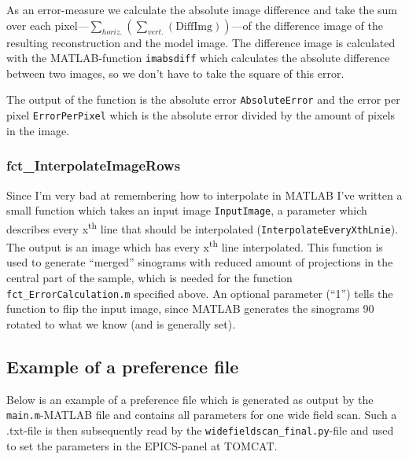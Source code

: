 \documentclass[a4paper]{scrartcl}
\begin{document}
As an error-measure we calculate the absolute image difference and take the sum over each pixel---$\sum_{horiz.}(\sum_{vert.}(\textrm{DiffImg}))$---of the difference image of the resulting reconstruction and the model image. The difference image is calculated with the MATLAB-function \verb+imabsdiff+ which calculates the absolute difference between two images, so we don't have to take the square of this error.

The output of the function is the absolute error \verb+AbsoluteError+ and the error per pixel \verb+ErrorPerPixel+ which is the absolute error divided by the amount of pixels in the image.

\subsubsection{fct_InterpolateImageRows}
Since I'm very bad at remembering how to interpolate in MATLAB I've written a small function which takes an input image \verb+InputImage+, a parameter which describes every x\textsuperscript{th} line that should be interpolated (\verb+InterpolateEveryXthLnie+). The output is an image which has every x\textsuperscript{th} line interpolated. This function is used to generate ``merged'' sinograms with reduced amount of projections in the central part of the sample, which is needed for the function \verb+fct_ErrorCalculation.m+ specified above. An optional parameter (``1'') tells the function to flip the input image, since MATLAB generates the sinograms \si{90}{\degree} rotated to what we know (and is generally set).

\subsection{Example of a preference file}%
\label{sec:preference file}
Below is an example of a preference file which is generated as output by the \verb+main.m+-MATLAB file and contains all parameters for one wide field scan. Such a .txt-file is then subsequently read by the \verb+widefieldscan_final.py+-file and used to set the parameters in the EPICS-panel at TOMCAT.

\lstset{
	basicstyle=\footnotesize,	%
	numbers=left,				%
	stepnumber=2,				%
	numbersep=7pt,				%
	frame=single,				%
	breaklines=true,			%
	}
	
\end{document}
